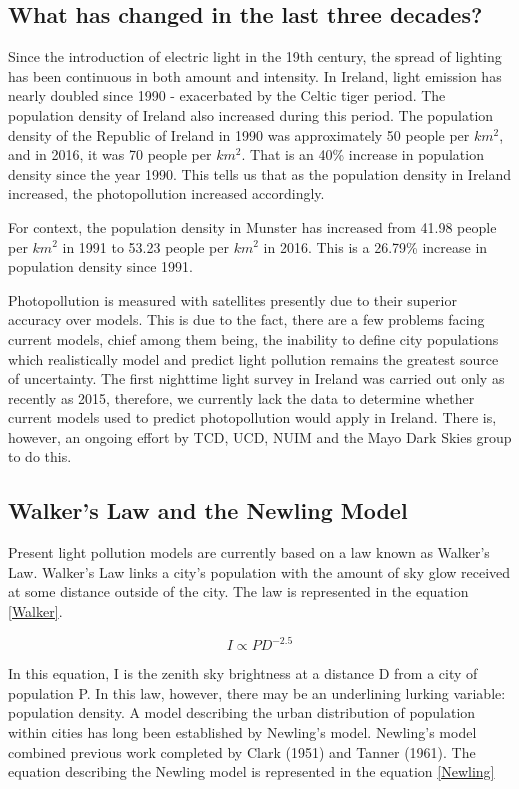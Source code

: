 \subsection{What has changed in the last three decades?}
Since the introduction of electric light in the 19th century, the  spread of lighting has been continuous in both amount and intensity. In Ireland, light emission has nearly doubled since 1990 - exacerbated by the Celtic tiger period. %
The population density of Ireland also increased during this period. The population density of the Republic of Ireland in 1990 was approximately 50 people per $km^2$, and in 2016, it was 70 people per $km^2$.\cite{1991}\cite{2016CensusTowns} That is an 40\% increase in population density since the year 1990. This tells us that as the population density in Ireland increased, the photopollution increased accordingly.

For context, the population density in Munster has increased from 41.98 people per $km^2$ in 1991 to 53.23 people per $km^2$ in 2016. This is a 26.79\% increase in population density since 1991.\cite{munster}

Photopollution is measured with satellites presently due to their superior accuracy over models. This is due to the fact, there are a few problems facing current models, chief among them being, the inability to define city populations which realistically model and predict light pollution remains the greatest source of uncertainty.\cite{uncertain} The first nighttime light survey in Ireland was carried out only as recently as 2015, therefore, we currently lack the data to determine whether current models used to predict photopollution would apply in Ireland. There is, however, an ongoing effort by TCD, UCD, NUIM and the Mayo Dark Skies group to do this. 

\subsection{Walker's Law and the Newling Model}
Present light pollution models are currently based on a law known as Walker's Law. Walker's Law links a city’s population with the amount of sky glow received at some distance outside of the city. The law is represented in the equation \ref{Walker}.\cite{walkerlaw} 

\begin{equation}
\label{Walker}
 I \propto PD^{-2.5}
\end{equation}

In this equation, I is the zenith sky brightness at a distance D from a city of population P. In this law, however, there may be an underlining lurking variable: population density. A model describing the urban distribution of population within cities has long been established by Newling's model. Newling's model combined previous work completed by Clark (1951) %
and Tanner (1961). The equation describing the Newling model is represented in the equation \ref{Newling} 

